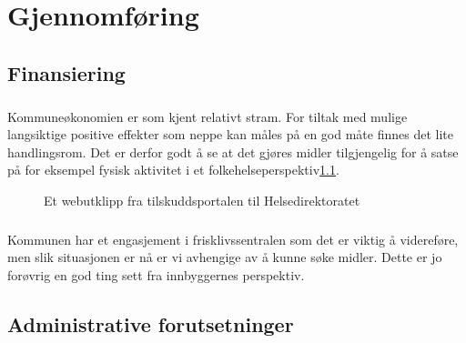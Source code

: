 \documentclass[11pt]{memoir} %
\begin{document}
\chapter{Gjennomføring}
	\section{Finansiering}
		\paragraph{}
			Kommuneøkonomien er som kjent relativt stram. For tiltak med mulige langsiktige positive effekter som neppe kan måles på en god måte finnes det lite handlingsrom. Det er derfor godt å se at det gjøres midler tilgjengelig for å satse på for eksempel fysisk aktivitet i et folkehelseperspektiv\ref{faktfhfig}.
					\begin{figure}[h]
                      \centering
                    	  \captionsetup{singlelinecheck=off}
                      	\caption{Et webutklipp fra tilskuddsportalen til Helsedirektoratet}
                      	\label{faktfhfig}
                    \end{figure}   
        \paragraph{}
            Kommunen har et engasjement i frisklivssentralen som det er viktig å videreføre, men slik situasjonen er nå er vi avhengige av å kunne søke midler. Dette er jo forøvrig en god ting sett fra innbyggernes perspektiv.
	\section{Administrative forutsetninger}
\end{document}
